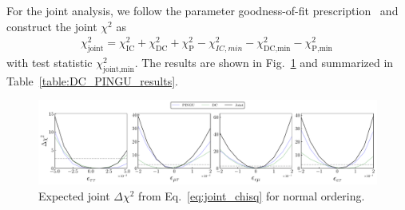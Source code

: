 \documentclass[draft=True]{revtex4-2}
\begin{document}
For the joint analysis, we follow the parameter goodness-of-fit prescription~\cite{maltoni2003} and construct the joint $\chi^2$ as 
\begin{align}\label{eq:joint_chisq}
    \chi^2_\text{joint} = \chi^2_\text{IC} + \chi^2_\text{DC} + \chi^2_\text{P} - \chi^2_{IC,min} - \chi^2_\text{DC,min} - \chi^2_\text{P,min}\,
\end{align}
with test statistic $\chi^2_\text{joint,min}$. The results are shown in Fig.~\ref{fig:joint_3D} and summarized in Table~\ref{table:DC_PINGU_results}.

\begin{figure}[t]
    \begin{center}
       \includegraphics[width=0.9\linewidth]{figures/joint_3D_NO.pdf}
    \end{center}
    \caption{Expected joint $\Delta \chi^2$ from Eq.~\ref{eq:joint_chisq} for normal ordering.}
    \label{fig:joint_3D}
 \end{figure}





\end{document}

